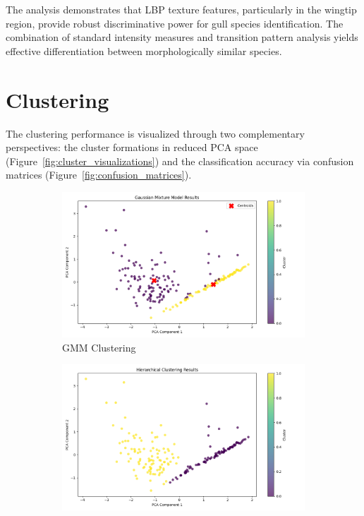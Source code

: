 \documentclass[a4paper,12pt]{report}
\begin{document}
The analysis demonstrates that LBP texture features, particularly in the wingtip region, provide robust discriminative power for gull species identification. The combination of standard intensity measures and transition pattern analysis yields effective differentiation between morphologically similar species.

\section{Clustering}
The clustering performance is visualized through two complementary perspectives: the cluster formations in reduced PCA space (Figure~\ref{fig:cluster_visualizations}) and the classification accuracy via confusion matrices (Figure~\ref{fig:confusion_matrices}).

\begin{figure}[htbp]
    \centering
    \begin{subfigure}[b]{0.32\textwidth}
        \centering
        \includegraphics[width=\textwidth]{images/clustering/gmm_clustering.png}
        \caption{GMM Clustering}
        \label{fig:gmm_cluster}
    \end{subfigure}
    \hfill
    \begin{subfigure}[b]{0.32\textwidth}
        \centering
        \includegraphics[width=\textwidth]{images/clustering/hierarchical_clustering.png}

\end{subfigure}
\end{figure}
\end{document}
